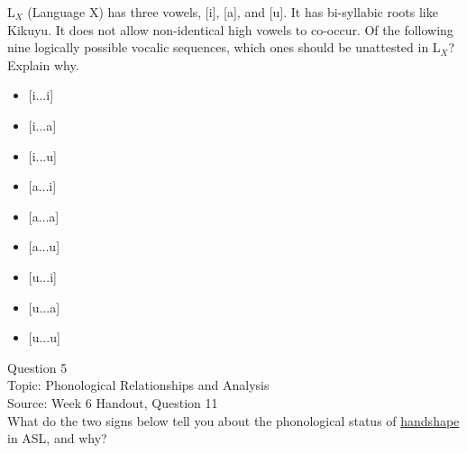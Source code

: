 \documentclass[12pt]{article}
\begin{document}
L$_X$ (Language X) has three vowels, [i], [a], and [u]. It has bi-syllabic roots like Kikuyu. It does not allow non-identical high vowels to co-occur. Of the following nine logically possible vocalic sequences, which ones should be unattested in L$_X$? Explain why.\\

\begin{itemize} \item {[i...i]} \item {[i...a]} \item {[i...u]} \item {[a...i]} \item {[a...a]} \item {[a...u]} \item {[u...i]} \item {[u...a]} \item {[u...u]} \end{itemize}


\newpage

{\large Question 5}\\

Topic: Phonological Relationships and Analysis\\
Source: Week 6 Handout, Question 11\\

What do the two signs below tell you about the phonological status of \underline{handshape} in ASL, and why?\\
\end{document}
